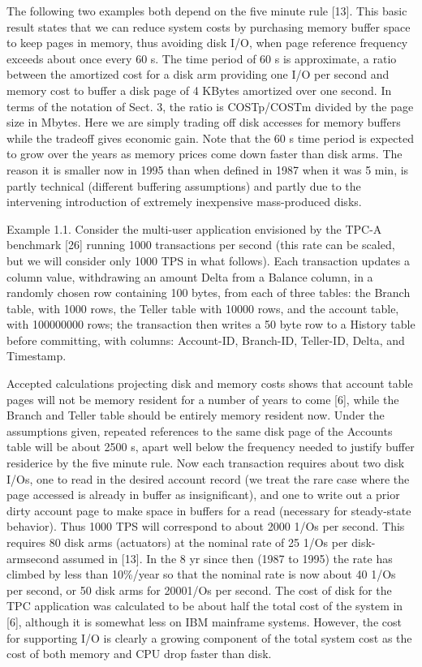 \documentclass[a4paper,11pt,notitlepage,twoside,openright]{article}
\begin{document}
The following two examples both depend on the five minute rule {[}13{]}.
This basic result states that we can reduce system costs by purchasing
memory buffer space to keep pages in memory, thus avoiding disk I/O,
when page reference frequency exceeds about once every 60 s. The time
period of 60 s is approximate, a ratio between the amortized cost for a
disk arm providing one I/O per second and memory cost to buffer a disk
page of 4 KBytes amortized over one second. In terms of the notation of
Sect. 3, the ratio is COSTp/COSTm divided by the page size in Mbytes.
Here we are simply trading off disk accesses for memory buffers while
the tradeoff gives economic gain. Note that the 60 s time period is
expected to grow over the years as memory prices come down faster than
disk arms. The reason it is smaller now in 1995 than when defined in
1987 when it was 5 min, is partly technical (different buffering
assumptions) and partly due to the intervening introduction of extremely
inexpensive mass-produced disks.

Example 1.1. Consider the multi-user application envisioned by the TPC-A
benchmark {[}26{]} running 1000 transactions per second (this rate can
be scaled, but we will consider only 1000 TPS in what follows). Each
transaction updates a column value, withdrawing an amount Delta from a
Balance column, in a randomly chosen row containing 100 bytes, from each
of three tables: the Branch table, with 1000 rows, the Teller table with
10000 rows, and the account table, with 100000000 rows; the transaction
then writes a 50 byte row to a History table before committing, with
columns: Account-ID, Branch-ID, Teller-ID, Delta, and Timestamp.

Accepted calculations projecting disk and memory costs shows that
account table pages will not be memory resident for a number of years to
come {[}6{]}, while the Branch and Teller table should be entirely
memory resident now. Under the assumptions given, repeated references to
the same disk page of the Accounts table will be about 2500 s, apart
well below the frequency needed to justify buffer residerice by the five
minute rule. Now each transaction requires about two disk I/Os, one to
read in the desired account record (we treat the rare case where the
page accessed is already in buffer as insignificant), and one to write
out a prior dirty account page to make space in buffers for a read
(necessary for steady-state behavior). Thus 1000 TPS will correspond to
about 2000 1/Os per second. This requires 80 disk arms (actuators) at
the nominal rate of 25 1/Os per disk-armsecond assumed in {[}13{]}. In
the 8 yr since then (1987 to 1995) the rate has climbed by less than
10\%/year so that the nominal rate is now about 40 1/Os per second, or
50 disk arms for 20001/Os per second. The cost of disk for the TPC
application was calculated to be about half the total cost of the system
in {[}6{]}, although it is somewhat less on IBM mainframe systems.
However, the cost for supporting I/O is clearly a growing component of
the total system cost as the cost of both memory and CPU drop faster
than disk.
\end{document}
